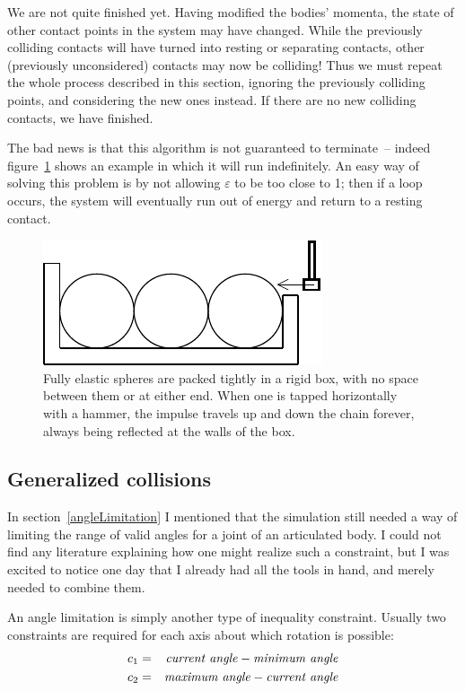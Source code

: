 We are not quite finished yet. Having modified the bodies' momenta, the state of other contact
points in the system may have changed. While the previously colliding contacts will have
turned into resting or separating contacts, other (previously unconsidered) contacts may now
be colliding! Thus we must repeat the whole process described in this section, ignoring the
previously colliding points, and considering the new ones instead. If there are no new colliding
contacts, we have finished.

The bad news is that this algorithm is not guaranteed to terminate~-- indeed
figure~\ref{contacts3Figure} shows an example in which it will run indefinitely. An easy way of
solving this problem is by not allowing $\varepsilon$ to be too close to 1; then if a loop
occurs, the system will eventually run out of energy and return to a resting contact.

\begin{figure}
\centerline{\includegraphics{figures/contacts3}}
\caption{Fully elastic spheres are packed tightly in a rigid box, with no space between them or at
    either end. When one is tapped horizontally with a hammer, the impulse travels up and down the
    chain forever, always being reflected at the walls of the box.\label{contacts3Figure}}
\end{figure}


\subsection{Generalized collisions\label{generalizedCollisions}}

In section~\ref{angleLimitation} I mentioned that the simulation still needed a way of limiting
the range of valid angles for a joint of an articulated body. I could not find any literature
explaining how one might realize such a constraint, but I was excited to notice one day that
I already had all the tools in hand, and merely needed to combine them.

An angle limitation is simply another type of inequality constraint. Usually two constraints are
required for each axis about which rotation is possible:
\begin{eqnarray}
c_1 & = & \mbox{\textit{current angle}} - \mbox{\textit{minimum angle}} \nonumber\\
c_2 & = & \mbox{\textit{maximum angle}} - \mbox{\textit{current angle}} \label{genCollIneq}
\end{eqnarray}

